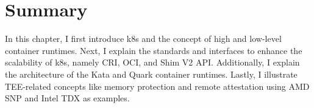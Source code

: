 \section{Summary}
In this chapter, I first introduce k8s and the concept of high and low-level container runtimes. Next, I explain the standards and interfaces to enhance the scalability of k8s, namely CRI, OCI, and Shim V2 API. Additionally, I explain the architecture of the Kata and Quark container runtimes. 
Lastly, I illustrate TEE-related concepts like memory protection and remote attestation using AMD SNP and Intel TDX as examples.
\cleardoublepage

